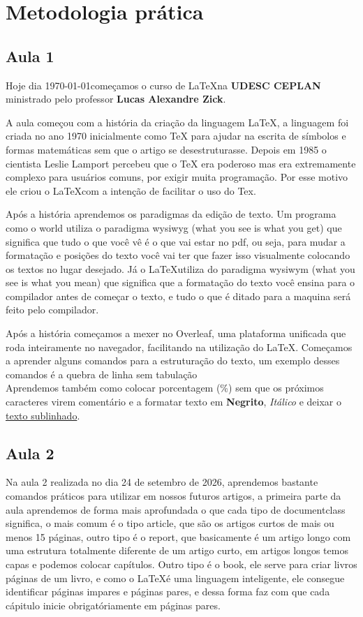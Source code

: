 

\chapter{Metodologia prática}
\lipsum[1-3]
\section{Aula 1}
Hoje dia \today começamos o curso de \LaTeX na \textbf{UDESC CEPLAN} ministrado pelo professor \textbf{Lucas Alexandre Zick}. 

A aula começou com a história da criação da linguagem \LaTeX, a linguagem foi criada no ano 1970 inicialmente como TeX para ajudar na escrita de símbolos e formas matemáticas sem que o artigo se desestruturasse. Depois em 1985 o cientista Leslie Lamport percebeu que o TeX era poderoso mas era extremamente complexo para usuários comuns, por exigir muita programação. Por esse motivo ele criou o \LaTeX com a intenção de facilitar o uso do Tex.

Após a história aprendemos os paradigmas da edição de texto. Um programa como o world utiliza o paradigma wysiwyg (what you see is what you get) que significa que tudo o que você vê é o que vai estar no pdf, ou seja, para mudar a formatação e posições do texto você vai ter que fazer isso visualmente colocando os textos no lugar desejado. Já o \LaTeX utiliza do paradigma wysiwym (what you see is what you mean) que significa que a formatação do texto você ensina para o compilador antes de começar o texto, e tudo o que é ditado para a maquina será feito pelo compilador. 

Após a história começamos a mexer no Overleaf, uma plataforma unificada que roda inteiramente no navegador, facilitando na utilização do \LaTeX. Começamos a aprender alguns comandos para a estruturação do texto, um exemplo desses comandos é a quebra de linha sem tabulação\\
Aprendemos também como colocar porcentagem (\%) sem que os próximos caracteres virem comentário e a formatar texto em \textbf{Negrito}, \textit{Itálico} e deixar o \underline{texto sublinhado}.


\section{Aula 2}
Na aula 2 realizada no dia 24 de setembro de 2026, aprendemos bastante comandos práticos para utilizar em nossos futuros artigos, a primeira parte da aula aprendemos de forma mais aprofundada o que cada tipo de documentclass significa, o mais comum é o tipo article, que são os artigos curtos de mais ou menos 15 páginas, outro tipo é o report, que basicamente é um artigo longo com uma estrutura totalmente diferente de um artigo curto, em artigos longos temos capas e podemos colocar capítulos. Outro tipo é o book, ele serve para criar livros páginas de um livro, e como o \LaTeX é uma linguagem inteligente, ele consegue identificar páginas impares e páginas pares, e dessa forma faz com que cada cápitulo inicie obrigatóriamente em páginas pares.

